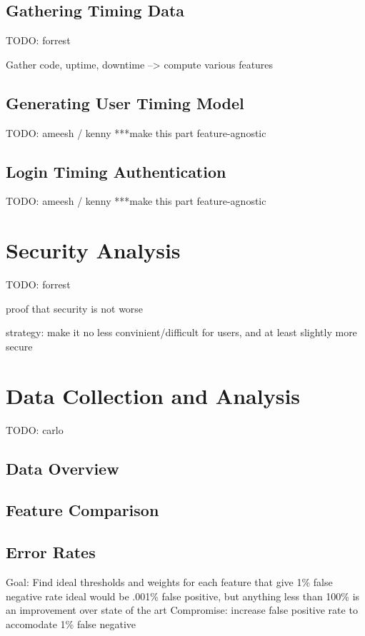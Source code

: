\documentclass{article}
\begin{document}
\subsection{Gathering Timing Data}
TODO: forrest

Gather code, uptime, downtime --> compute various features

\subsection{Generating User Timing Model}
TODO: ameesh / kenny  ***make this part feature-agnostic

\subsection{Login Timing Authentication}
TODO: ameesh / kenny  ***make this part feature-agnostic 

\section{Security Analysis}
TODO: forrest

proof that security is not worse

strategy: make it no less convinient/difficult for users, and at least slightly more secure

\section{Data Collection and Analysis}
TODO: carlo

\subsection{Data Overview}

\subsection{Feature Comparison} %


\subsection{Error Rates}    %

Goal: Find ideal thresholds and weights for each feature that give 1\% false negative rate
ideal would be  .001\% false positive, but anything less than 100\% is an improvement over state of the art
Compromise: increase false positive rate to accomodate 1\% false negative
\end{document}
